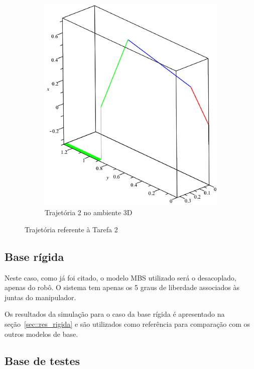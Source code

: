\begin{figure}[h!]
\begin{subfigure}[b]{0.4\textwidth}
        \includegraphics[width=\textwidth]{figs/traj2_3d}
        \caption{Trajetória 2 no ambiente 3D}
        \label{fig::traj2_3d}
    \end{subfigure}
    \caption{Trajetória referente à Tarefa 2}
    \label{fig::traj2_subf}
\end{figure}


\subsection{Base rígida}

Neste caso, como já foi citado, o modelo MBS utilizado será o desacoplado,
apenas do robô. O sistema tem apenas os 5 graus de liberdade associados às juntas do
manipulador.

Os resultados da simulação para o caso da base rígida é apresentado na
seção~\ref{sec::res_rigida} e são utilizados como referência para comparação
com os outros modelos de base.


\subsection{Base de testes}

